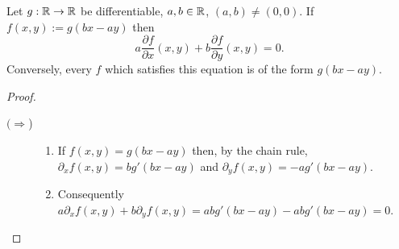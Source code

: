 \begin{theorem}
    Let \(g:\mathbb{R}\to\mathbb{R}\) be differentiable, \(a,b\in \mathbb{R}\), \((a,b)\neq (0,0)\).
    If \(f(x,y):= g(bx-ay)\) then
    \[
        a \frac{\partial f}{\partial x} (x,y) + b \frac{\partial f}{\partial y} (x,y) = 0.
    \]
    Conversely, every \(f\) which satisfies this equation is of the form \(g(bx-ay)\).
\end{theorem}


\begin{proof}
    \begin{description}
        \item[\((\Rightarrow\))]
              \begin{enumerate}
                  \item If \(f(x,y)= g(bx-ay)\) then, by the chain rule,
                        \(\partial_x f(x,y) = bg'(bx-ay)\) and \(\partial_y f(x,y) = -ag'(bx-ay)\).
                  \item
                        Consequently \(a\partial_x f(x,y) + b \partial_y f(x,y) = a bg'(bx-ay) - abg'(bx-ay) = 0\).
              \end{enumerate}


\end{description}
\end{proof}
